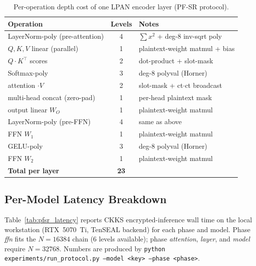 \begin{table}[htbp]
\centering
\caption{Per-operation depth cost of one LPAN encoder layer (PF-SR protocol).}
\label{tab:pfsr_depth}
\begin{tabular}{lcl}
\toprule
\textbf{Operation} & \textbf{Levels} & \textbf{Notes} \\
\midrule
LayerNorm-poly (pre-attention)         & 4 & $\sum x^2$ + deg-8 inv-sqrt poly \\
$Q,K,V$ linear (parallel)              & 1 & plaintext-weight matmul + bias \\
$Q\!\cdot\!K^\top$ scores              & 2 & dot-product + slot-mask \\
Softmax-poly                           & 3 & deg-8 polyval (Horner) \\
attention $\cdot V$                    & 2 & slot-mask + ct$\cdot$ct broadcast \\
multi-head concat (zero-pad)           & 1 & per-head plaintext mask \\
output linear $W_O$                    & 1 & plaintext-weight matmul \\
LayerNorm-poly (pre-FFN)               & 4 & same as above \\
FFN $W_1$                              & 1 & plaintext-weight matmul \\
GELU-poly                              & 3 & deg-8 polyval (Horner) \\
FFN $W_2$                              & 1 & plaintext-weight matmul \\
\midrule
\textbf{Total per layer}               & \textbf{23} & \\
\bottomrule
\end{tabular}
\end{table}

\subsection{Per-Model Latency Breakdown}
Table~\ref{tab:pfsr_latency} reports CKKS encrypted-inference wall time on the local workstation (RTX~5070~Ti, TenSEAL backend) for each phase and model. Phase \emph{ffn} fits the $N{=}16384$ chain (6 levels available); phase \emph{attention}, \emph{layer}, and \emph{model} require $N{=}32768$. Numbers are produced by \texttt{python experiments/run\_protocol.py --model <key> --phase <phase>}.

